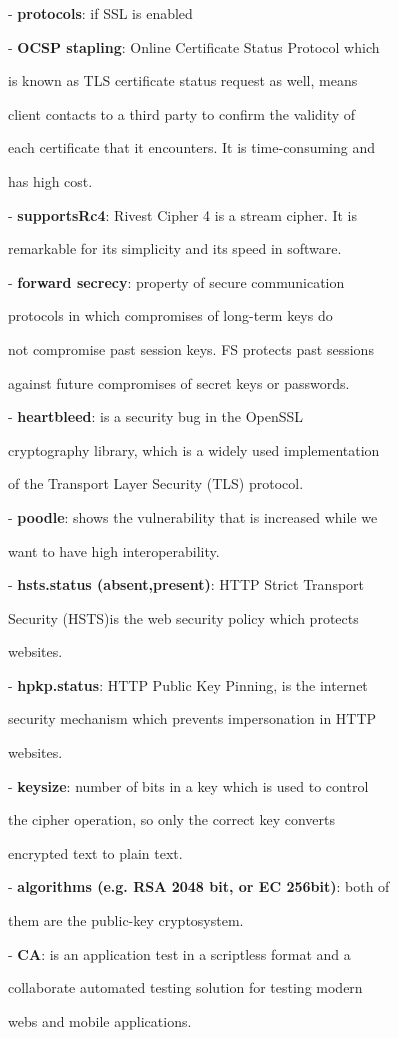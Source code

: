 \documentclass[journal]{IEEEtran}
\begin{document}
- \textbf{protocols}: if SSL is enabled 
\par- \textbf{OCSP stapling}: Online Certificate Status Protocol which \par is known as TLS certificate status request as well, means \par client contacts to a third party to confirm the validity of \par each certificate that it encounters. It is time-consuming and \par has high cost.
\par- \textbf{supportsRc4}: Rivest Cipher 4 is a stream cipher. It is \par remarkable for its simplicity and its speed in software.
\par- \textbf{forward secrecy}: property of secure communication \par protocols in which compromises of long-term keys do \par not compromise past session keys. FS protects past sessions \par against future compromises of secret keys or passwords.
\par- \textbf{heartbleed}:  is a security bug in the OpenSSL \par cryptography library, which is a widely used implementation \par of the Transport Layer Security (TLS) protocol. 
\par- \textbf{poodle}: shows the vulnerability that is increased while we \par want to have high interoperability. 
\par- \textbf{hsts.status (absent,present)}: HTTP Strict Transport \par Security (HSTS)is the web security policy which protects \par websites.
\par- \textbf{hpkp.status}: HTTP Public Key Pinning, is the internet \par security mechanism which prevents impersonation in HTTP \par websites.
\par- \textbf{keysize}: number of bits in a key which is used to control \par the cipher operation, so only the correct key converts \par encrypted text to plain text.
\par- \textbf{algorithms (e.g. RSA 2048 bit, or EC 256bit)}: both of \par them are the public-key cryptosystem. 
\par- \textbf{CA}: is an application test in a scriptless format and a \par collaborate automated testing solution for testing modern \par webs and mobile applications.
\end{document}
